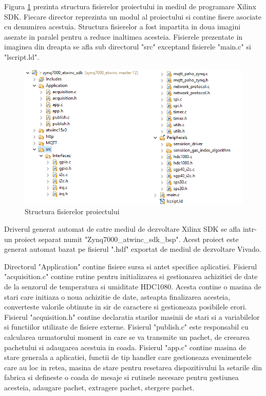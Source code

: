 Figura \ref{fig:PI_SDKFileStructure} prezinta structura fisierelor proiectului in mediul de programare Xilinx SDK. Fiecare director reprezinta un modul al proiectului 
si contine fisere asociate cu denumirea acestuia. Structura fisierelor a fost impartita in doua imagini asezate in paralel pentru a reduce inaltimea acesteia. Fisierele 
prezentate in imaginea din dreapta se afla sub directorul "src" exceptand fisierele "main.c" si "lscript.ld".
\begin{figure}[H]
    \centering
    \includegraphics[scale=0.66]{figs/PI_SDKFileStructure.png}
    \caption{Structura fisierelor proiectului}
    \label{fig:PI_SDKFileStructure}
\end{figure}

Driverul generat automat de catre mediul de dezvoltare Xilinx SDK se afla intr-un proiect separat numit "Zynq7000\_atwinc\_sdk\_bsp". Acest proiect este generat automat 
bazat pe fisierul ".hdf" exportat de mediul de dezvoltare Vivado.

Directorul "Application" contine fisiere sursa si antet specifice aplicatiei. Fisierul "acquisition.c" contine rutine pentru initializarea si gestionarea achizitiei 
de date de la senzorul de temperatura si umiditate HDC1080. Acesta contine o masina de stari care initiaza o noua achizitie de date, asteapta finalizarea acesteia, 
converteste valorile obtinute in sir de caractere si gestioneaza posibilele erori. Fisierul "acquisition.h" contine declaratia starilor masinii de stari si a 
variabilelor si functiilor utilizate de fisiere externe. Fisierul "publish.c" este responsabil cu calcularea urmatorului moment in care se va transmite un pachet,
de creearea pachetului si adaugarea acestuia in coada. Fisierul "app.c" contine masina de stare generala a aplicatiei, functii de tip handler care gestioneaza 
evenimentele care au loc in retea, masina de stare pentru resetarea dispozitivului la setarile din fabrica si defineste o coada de mesaje si rutinele necesare 
pentru gestiunea acesteia, adaugare pachet, extragere pachet, stergere pachet. 

